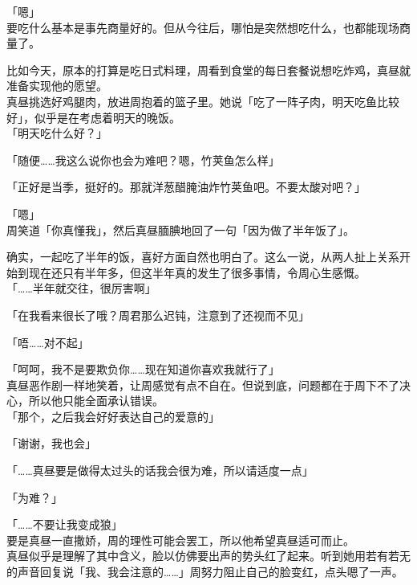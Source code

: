 「嗯」\\

要吃什么基本是事先商量好的。但从今往后，哪怕是突然想吃什么，也都能现场商量了。

比如今天，原本的打算是吃日式料理，周看到食堂的每日套餐说想吃炸鸡，真昼就准备实现他的愿望。\\

真昼挑选好鸡腿肉，放进周抱着的篮子里。她说「吃了一阵子肉，明天吃鱼比较好」，似乎是在考虑着明天的晚饭。\\

「明天吃什么好？」

「随便……我这么说你也会为难吧？嗯，竹荚鱼怎么样」

「正好是当季，挺好的。那就洋葱醋腌油炸竹荚鱼吧。不要太酸对吧？」

「嗯」\\

周笑道「你真懂我」，然后真昼腼腆地回了一句「因为做了半年饭了」。

确实，一起吃了半年的饭，喜好方面自然也明白了。这么一说，从两人扯上关系开始到现在还只有半年多，但这半年真的发生了很多事情，令周心生感慨。\\

「……半年就交往，很厉害啊」

「在我看来很长了哦？周君那么迟钝，注意到了还视而不见」

「唔……对不起」

「呵呵，我不是要欺负你……现在知道你喜欢我就行了」\\

真昼恶作剧一样地笑着，让周感觉有点不自在。但说到底，问题都在于周下不了决心，所以他只能全面承认错误。\\

「那个，之后我会好好表达自己的爱意的」

「谢谢，我也会」

「……真昼要是做得太过头的话我会很为难，所以请适度一点」

「为难？」

「……不要让我变成狼」\\

要是真昼一直撒娇，周的理性可能会罢工，所以他希望真昼适可而止。\\

真昼似乎是理解了其中含义，脸以仿佛要出声的势头红了起来。听到她用若有若无的声音回复说「我、我会注意的……」周努力阻止自己的脸变红，点头嗯了一声。
